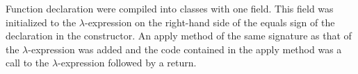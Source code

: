 Function declaration were compiled into classes with one
field. This field was initialized to the $\lambda$-expression on the right-hand side of the equals sign of the declaration in the constructor. An apply method of the
same signature as that of the $\lambda$-expression was added and the code contained in the apply method was a call to the $\lambda$-expression followed by a return.



